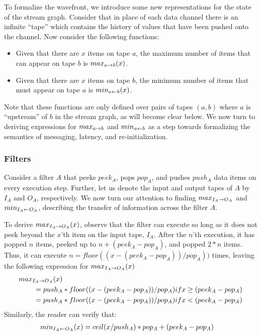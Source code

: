 To formalize the wavefront, we introduce some new representations for
the state of the stream graph.  Consider that in place of each data
channel there is an infinite ``tape'' which contains the history of
values that have been pushed onto the channel.  Now consider the
following functions:

\begin{itemize}

\item Given that there are $x$ items on tape $a$, the maximum number
of items that can appear on tape $b$ is $max_{a \rightarrow b}(x)$.

\item Given that there are $x$ items on tape $b$, the minimum number
of items that must appear on tape $a$ is $min_{a \leftarrow b}(x)$.

\end{itemize}

Note that these functions are only defined over pairs of tapes $(a,
b)$ where $a$ is ``upstream'' of $b$ in the stream graph, as will
become clear below.  We now turn to deriving expressions for
$max_{a \rightarrow b}$ and $min_{a \leftarrow b}$ as a step towards formalizing the
semantics of messaging, latency, and re-initialization.

\subsubsection{Filters}

Consider a filter $A$ that peeks $peek_A$, pops $pop_A$, and pushes
$push_A$ data items on every execution step.  Further, let us denote
the input and output tapes of $A$ by $I_A$ and $O_A$, respectively.
We now turn our attention to finding $max_{I_A \rightarrow O_A}$ and
$min_{I_A \leftarrow O_A}$, describing the transfer of information across the
filter $A$.

To derive $max_{I_A \rightarrow O_A}(x)$, observe that the filter can execute so
long as it does not peek beyond the $x$'th item on the input tape,
$I_A$.  After the $n$'th execution, it has popped $n$ items, peeked up
to $n + (peek_A - pop_A)$, and popped $2 * n$ items.  Thus, it can
execute $n = floor((x - (peek_A - pop_A)) / pop_A))$ times, leaving
the following expression for $max_{I_A \rightarrow O_A}(x)$
\begin{eqnarray*}
max_{I_A \rightarrow O_A}(x)& \\ = push_A&*floor((x-(peek_A-pop_A))/pop_A) if x \ge (peek_A-pop_A) \\
         = push_A&*floor((x-(peek_A-pop_A))/pop_A) if x <  (peek_A-pop_A)
\end{eqnarray*}
Similarly, the reader can verify that:
\begin{eqnarray*}
min_{I_A \leftarrow O_A}(x)&= ceil(x/push_A)*pop_A+(peek_A-pop_A)
\end{eqnarray*}

